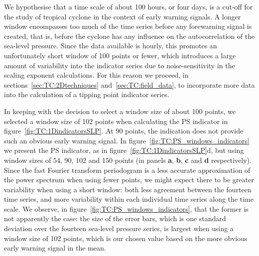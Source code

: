 We hypothesise that a time scale of about 100 hours, or four days, is a cut-off for the study of tropical cyclone in the context of early warning signals. A longer window encompasses too much of the time series before any forewarning signal is created, that is, before the cyclone has any influence on the autocorrelation of the sea-level pressure. Since the data available is hourly, this promotes an unfortunately short window of 100 points or fewer, which introduces a large amount of variability into the indicator series due to noise-sensitivity in the scaling exponent calculations. For this reason we proceed, in sections~\ref{sec:TC:2Dtechniques} and~\ref{sec:TC:field_data}, to incorporate more data into the calculation of a tipping point indicator series.

In keeping with the decision to select a window size of about 100 points, we selected a window size of 102 points when calculating the PS indicator in figure~\ref{fig:TC:1DindicatorsSLP}. At 90 points, the indication does not provide such an obvious early warning signal. In figure~\ref{fig:TC:PS_windows_indicators} we present the PS indicator, as in figure~\ref{fig:TC:1DindicatorsSLP}d, but using window sizes of 54, 90, 102 and 150 points (in panels \textbf{a}, \textbf{b}, \textbf{c} and \textbf{d} respectively). Since the fast Fourier transform periodogram is a less accurate approximation of the power spectrum when using fewer points, we might expect there to be greater variability when using a short window: both less agreement between the fourteen time series, and more variability within each individual time series along the time scale. We observe, in figure~\ref{fig:TC:PS_windows_indicators}, that the former is not apparently the case: the size of the error bars, which is one standard deviation over the fourteen sea-level pressure series, is largest when using a window size of 102 points, which is our chosen value based on the more obvious early warning signal in the mean. 

